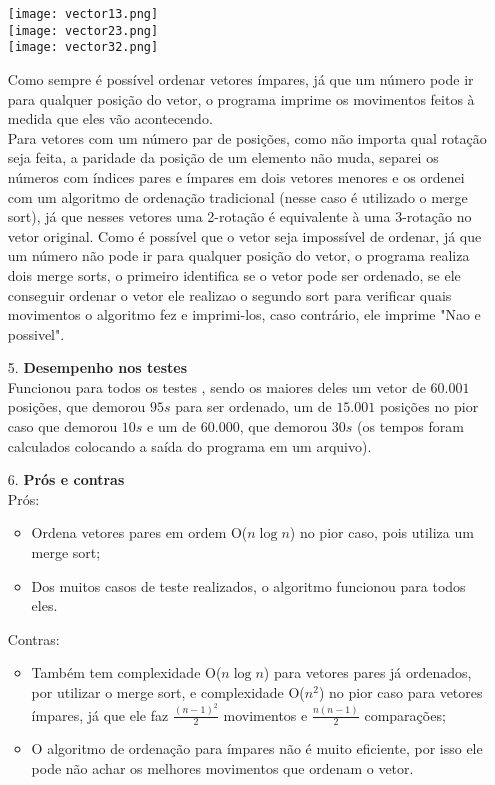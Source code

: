 \documentclass[12pt, a4paper]{article} %
\begin{document}
\begin{enumerate}
\small
\begin{center}
\texttt{[image: vector13.png]}\\
\texttt{[image: vector23.png]}\\
\texttt{[image: vector32.png]}\\
\end{center}
\normalsize
Como sempre é possível ordenar vetores ímpares, já que um número pode ir para qualquer posição do vetor, o programa imprime os movimentos feitos à medida que eles vão acontecendo.\\
Para vetores com um número par de posições, como não importa qual rotação seja feita, a paridade da posição de um elemento não muda, separei os números com índices pares e ímpares em dois vetores menores e os ordenei com um algoritmo de ordenação tradicional (nesse caso é utilizado o merge sort), já que nesses vetores uma 2-rotação é equivalente à uma 3-rotação no vetor original. Como é possível que o vetor seja impossível de ordenar, já que um número não pode ir para qualquer posição do vetor, o programa realiza dois merge sorts, o primeiro identifica se o vetor pode ser ordenado, se ele conseguir ordenar o vetor ele realizao o segundo sort para verificar quais movimentos o algoritmo fez e imprimi-los, caso contrário, ele imprime "Nao e possivel".\\[0.5cm]
\large
\item[5.]\textbf{Desempenho nos testes}
\normalsize\\[0.5cm]
Funcionou para todos os testes , sendo os maiores deles um vetor de $60.001$ posições, que demorou $95s$ para ser ordenado, um de $15.001$ posições no pior caso que demorou $10s$ e um de $60.000$, que demorou $30s$ (os tempos foram calculados colocando a saída do programa em um arquivo).\\[0.5cm]
\large
\item[6.]\textbf{Prós e contras}
\normalsize\\[0.5cm]
Prós:
\begin{itemize}
\item Ordena vetores pares em ordem O($n\log{n}$) no pior caso, pois utiliza um merge sort;
\item Dos muitos casos de teste realizados, o algoritmo funcionou para todos eles.
\end{itemize}
Contras:
\begin{itemize}
\item Também tem complexidade O($n\log{n}$) para vetores pares já ordenados, por utilizar o merge sort, e complexidade O($n^2$) no pior caso para vetores ímpares, já que ele faz $\frac{(n-1)^2}{2}$ movimentos e $\frac{n(n-1)}{2}$ comparações;
\item O algoritmo de ordenação para ímpares não é muito eficiente, por isso ele pode não achar os melhores movimentos que ordenam o vetor.
\end{itemize}
\end{enumerate}
\end{document}
